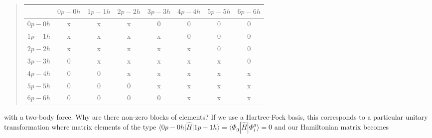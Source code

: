 \documentclass[%
twoside,                 %
final,                   %
10pt]{article}
\begin{document}
\begin{quote}
\begin{tabular}{cccccccc}
\hline
\multicolumn{1}{c}{  } & \multicolumn{1}{c}{ $0p-0h$ } & \multicolumn{1}{c}{ $1p-1h$ } & \multicolumn{1}{c}{ $2p-2h$ } & \multicolumn{1}{c}{ $3p-3h$ } & \multicolumn{1}{c}{ $4p-4h$ } & \multicolumn{1}{c}{ $5p-5h$ } & \multicolumn{1}{c}{ $6p-6h$ } \\
\hline
$0p-0h$ & x       & x       & x       & 0       & 0       & 0       & 0       \\
$1p-1h$ & x       & x       & x       & x       & 0       & 0       & 0       \\
$2p-2h$ & x       & x       & x       & x       & x       & 0       & 0       \\
$3p-3h$ & 0       & x       & x       & x       & x       & x       & 0       \\
$4p-4h$ & 0       & 0       & x       & x       & x       & x       & x       \\
$5p-5h$ & 0       & 0       & 0       & x       & x       & x       & x       \\
$6p-6h$ & 0       & 0       & 0       & 0       & x       & x       & x       \\
\hline
\end{tabular}
\end{quote}

\noindent
with a two-body force. Why are there non-zero blocks of elements? 
If we use a Hartree-Fock basis, this corresponds to a particular unitary transformation where matrix elements of the type $\langle 0p-0h \vert \hat{H} \vert 1p-1h\rangle =\langle \Phi_0 | \hat{H}|\Phi_{i}^{a}\rangle=0$ and our Hamiltonian matrix becomes 
\end{document}
